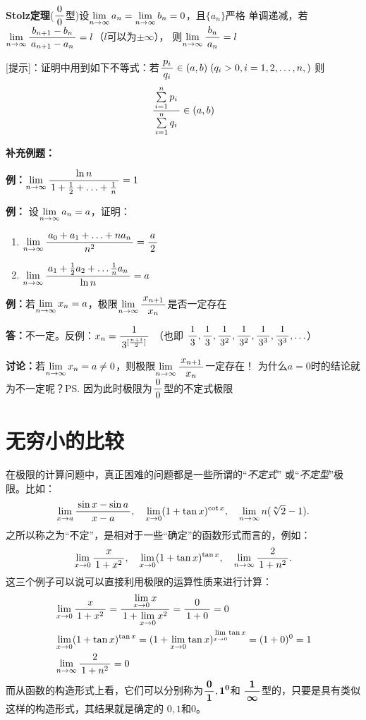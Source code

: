 {\bf Stolz定理}($\df00$型)设$\limn a_n=\limn b_n=0$，且$\{a_n\}$严格
单调递减，若$\limn\df{b_{n+1}-b_n}{a_{n+1}-a_n}=l$（$l$可以为$\pm\infty$），
则$\limn\df{b_n}{a_n}=l$

[提示]：证明中用到如下不等式：若$\df{p_i}{q_i}\in(a,b)\;(q_i>0,i=1,2,\ldots,n,)$
则
$$\df{\sum\limits_{i=1}^np_i}{\sum\limits_{i=1}^nq_i}\in(a,b)$$

{\bf 补充例题：}


{\bf 例：}$\limn\df{\ln n}{1+\frac12+\ldots+\frac1n}=1$

{\bf 例：} 设$\limn a_n=a$，证明：
\begin{enumerate}[(1)]
  \setlength{\itemindent}{1cm}
  \item $\limn\df{a_0+a_1+\ldots+na_n}{n^2}=\df a2$
  \item $\limn\df{a_1+\frac12a_2+\ldots\frac1na_n}{\ln n}=a$
\end{enumerate}

{\bf 例：}若$\limn x_n=a$，极限$\limn\df{x_{n+1}}{x_n}$是否一定存在

{\bf 答：}不一定。反例：$x_n=\df1{3^{[\frac{n+1}2]}}$ （也即
$\df13, \df13, \df 1{3^2}, \df1{3^2}, \df1{3^3}, \df1{3^3},\ldots$）

{\bf 讨论：}若$\limn x_n=a\ne 0$，则极限$\limn\df{x_{n+1}}{x_n}$一定存在！
为什么$a=0$时的结论就为不一定呢？\ps{因为此时极限为$\df00$型的不定式极限}

\section{无穷小的比较}

在极限的计算问题中，真正困难的问题都是一些所谓的“{\it 不定式}”
或“{\it 不定型}”极限。比如：
$$\limx{a}\df{\sin x-\sin a}{x-a},\quad \limx{0}(1+\tan x)^{\cot x},
\quad \limn n(\sqrt[n]2-1).$$
之所以称之为“不定”，是相对于一些“确定”的函数形式而言的，例如：
$$\limx{0}\df{x}{1+x^2},\quad \limx{0}(1+\tan x)^{\tan x},
\quad \limn\df{2}{1+n^2}.$$
这三个例子可以说可以直接利用极限的运算性质来进行计算：
\begin{align*}
	&\limx{0}\df{x}{1+x^2}=\df{\limx{0} x}{1+\limx{0}x^2}=\df0{1+0}=0\\
	&\limx{0}(1+\tan x)^{\tan x}=(1+\limx{0}\tan x)^{\limx{0}\tan x}
	=(1+0)^0=1\\
	&\limn\df{2}{1+n^2}=0
\end{align*}
而从函数的构造形式上看，它们可以分别称为$\df{\bm{0}}{\bm{1}},\bm{1^0}$和
$\df{\bm{1}}{\bm{\infty}}$型的，只要是具有类似这样的构造形式，其结果就是确定的
$0,1$和$0$。

